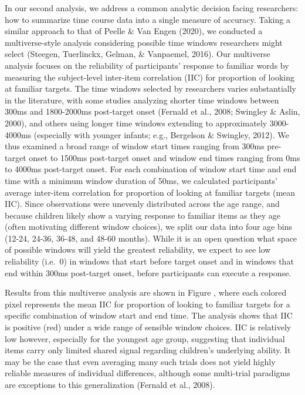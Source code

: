 \documentclass[
  english,
  man]{apa6}
\begin{document}
In our second analysis, we address a common analytic decision facing researchers: how to summarize time course data into a single measure of accuracy. Taking a similar approach to that of Peelle \& Van Engen (2020), we conducted a multiverse-style analysis considering possible time windows researchers might select (Steegen, Tuerlinckx, Gelman, \& Vanpaemel, 2016). Our multiverse analysis focuses on the reliability of participants' response to familiar words by measuring the subject-level inter-item correlation (IIC) for proportion of looking at familiar targets. The time windows selected by researchers varies substantially in the literature, with some studies analyzing shorter time windows between 300ms and 1800-2000ms post-target onset (Fernald et al., 2008; Swingley \& Aslin, 2000), and others using longer time windows extending to approximately 3000-4000ms (especially with younger infants; e.g., Bergelson \& Swingley, 2012). We thus examined a broad range of window start times ranging from 300ms pre-target onset to 1500ms post-target onset and window end times ranging from 0ms to 4000ms post-target onset. For each combination of window start time and end time with a minimum window duration of 50ms, we calculated participants' average inter-item correlation for proportion of looking at familiar targets (mean IIC). Since observations were unevenly distributed across the age range, and because children likely show a varying response to familiar items as they age (often motivating different window choices), we split our data into four age bins (12-24, 24-36, 36-48, and 48-60 months). While it is an open question what space of possible windows will yield the greatest reliability, we expect to see low reliability (i.e.~0) in windows that start before target onset and in windows that end within 300ms post-target onset, before participants can execute a response.

Results from this multiverse analysis are shown in Figure , where each colored pixel represents the mean IIC for proportion of looking to familiar targets for a specific combination of window start and end time. The analysis shows that IIC is positive (red) under a wide range of sensible window choices. IIC is relatively low however, especially for the youngest age group, suggesting that individual items carry only limited shared signal regarding children's underlying ability. It may be the case that even averaging many such trials does not yield highly reliable measures of individual differences, although some multi-trial paradigms are exceptions to this generalization (Fernald et al., 2008).
\end{document}
